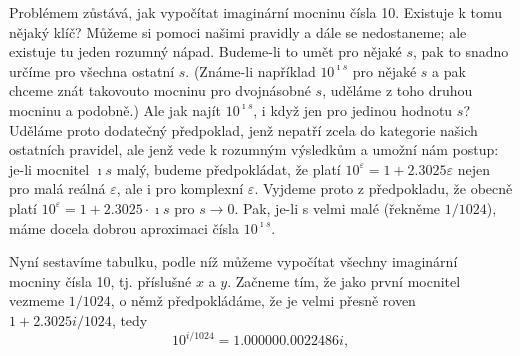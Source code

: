     Problémem zůstává, jak vypočítat imaginární mocninu čísla \num{10}. Existuje k tomu nějaký klíč?
    Můžeme si pomoci našimi pravidly a dále se nedostaneme; ale existuje tu jeden rozumný nápad.
    Budeme-li to umět pro nějaké \(s\), pak to snadno určíme pro všechna ostatní \(s\). (Známe-li
    například \(10^{\imath s}\) pro nějaké \(s\) a pak chceme znát takovouto mocninu pro dvojnásobné
    \(s\), uděláme z toho druhou mocninu a podobně.) Ale jak najít \(10^{\imath s}\), i když jen pro
    jedinou hodnotu \(s\)? Uděláme proto dodatečný předpoklad, jenž nepatří zcela do kategorie
    našich ostatních pravidel, ale jenž vede k rozumným výsledkům a umožní nám postup: je-li
    mocnitel \(\imath s\) malý, budeme předpokládat, že platí \(10^\varepsilon = 1 +
    \num{2.3025}\varepsilon\) nejen pro malá reálná \(\varepsilon\), ale i pro komplexní
    \(\varepsilon\). Vyjdeme proto z předpokladu, že obecně platí \(10^\varepsilon = 1 +
    \num{2.3025}\cdot\imath s\) pro \(s\rightarrow0\). Pak, je-li s velmi malé (řekněme \(1/1024\)),
    máme docela dobrou aproximaci čísla \(10^{\imath s}\).

    Nyní sestavíme tabulku, podle níž můžeme vypočítat všechny imaginární mocniny čísla \num{10},
    tj. příslušné \(x\) a \(y\). Začneme tím, že jako první mocnitel vezmeme \(1/1024\), o němž
    předpokládáme, že je velmi přesně roven \(1 + \num{2.3025i}/1024\), tedy 
    \begin{equation}\label{fyz:eq700}
      10^{i/1024}=\num{1.00000+0.0022486i},
    \end{equation}
  
